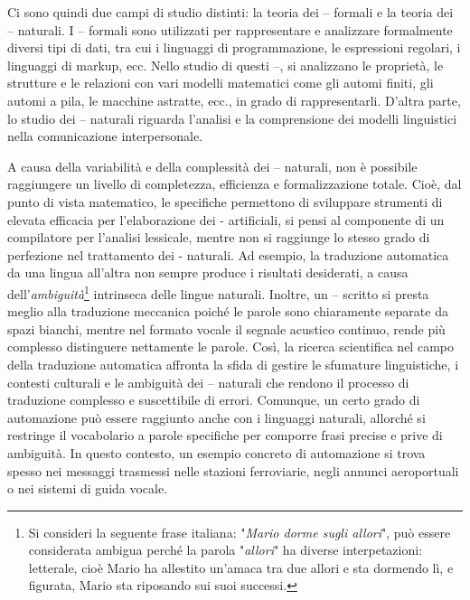 \documentclass[10pt,a4paper,twoside]{article} %
\begin{document}
\begin{multicols*}{2}
{    Ci sono quindi due campi di studio distinti: la teoria dei -- formali e la
    teoria dei -- naturali. I -- formali sono utilizzati per rappresentare e
    analizzare formalmente diversi tipi di dati, tra cui i linguaggi di
    programmazione, le espressioni regolari, i linguaggi di markup, ecc.
    Nello studio di questi --, si analizzano le proprietà, le strutture e le
    relazioni con vari modelli matematici come gli automi finiti, gli automi a
    pila, le macchine astratte, ecc., in grado di rappresentarli. D'altra parte,
    lo studio dei -- naturali riguarda l'analisi e la comprensione dei modelli
    linguistici nella comunicazione interpersonale.

    A causa della variabilità e della complessità dei -- naturali, non è
    possibile raggiungere un livello di completezza, efficienza e formalizzazione
    totale. Cioè, dal punto di vista matematico, le specifiche permettono di
    sviluppare strumenti di elevata efficacia per l'elaborazione dei - artificiali,
    si pensi al componente di un compilatore per l'analisi lessicale, mentre non
    si raggiunge lo stesso grado di perfezione nel trattamento dei - naturali.
    Ad esempio, la traduzione automatica da una lingua all'altra non sempre
    produce i risultati desiderati, a causa dell'\textit{ambiguità}\footnote{Si consideri la seguente
    frase italiana: "\textit{Mario dorme sugli allori}", può essere considerata ambigua
    perché la parola "\textit{allori}" ha diverse interpetazioni: letterale,
    cioè Mario ha allestito un'amaca tra due allori e sta dormendo lì, e
    figurata, Mario sta riposando sui suoi successi.} intrinseca delle lingue
    naturali. Inoltre, un -- scritto si presta meglio alla traduzione meccanica
    poiché le parole sono chiaramente separate da spazi bianchi, mentre nel
    formato vocale il segnale acustico continuo, rende più complesso distinguere
    nettamente le parole. Così, la ricerca scientifica nel campo della traduzione
    automatica affronta la sfida di gestire le sfumature linguistiche, i contesti
    culturali e le ambiguità dei -- naturali che rendono il processo di traduzione
    complesso e suscettibile di errori. Comunque, un certo grado di automazione
    può essere raggiunto anche con i linguaggi naturali, allorché si restringe
    il vocabolario a parole specifiche per comporre frasi precise e prive di
    ambiguità. In questo contesto, un esempio concreto di automazione si trova
    spesso nei messaggi trasmessi nelle stazioni ferroviarie, negli annunci
    aeroportuali o nei sistemi di guida vocale.

}
\end{multicols*}
\end{document}
